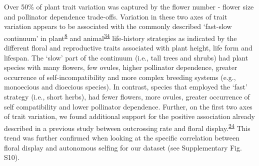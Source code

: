 \documentclass[
  12pt,
  a4paper,
]{article}
\begin{document}
Over 50\% of plant trait variation was captured by the flower number - flower size and pollinator dependence trade-offs. Variation in these two axes of trait variation appears to be associated with the commonly described `fast-slow continuum' in plant\textsuperscript{\protect\hyperlink{ref-salguero2016}{8}} and animal\textsuperscript{\protect\hyperlink{ref-healy2019}{34}} life-history strategies as indicated by the different floral and reproductive traits associated with plant height, life form and lifespan. The `slow' part of the continuum (i.e., tall trees and shrubs) had plant species with many flowers, few ovules, higher pollinator dependence, greater occurrence of self-incompatibility and more complex breeding systems (e.g., monoecious and dioecious species). In contrast, species that employed the `fast' strategy (i.e., short herbs), had fewer flowers, more ovules, greater occurrence of self compatibility and lower pollinator dependence. Further, on the first two axes of trait variation, we found additional support for the positive association already described in a previous study between outcrossing rate and floral display.\textsuperscript{\protect\hyperlink{ref-goodwillie2010}{24}} This trend was further confirmed when looking at the specific correlation between floral display and autonomous selfing for our dataset (see Supplementary Fig. S10).
\end{document}
